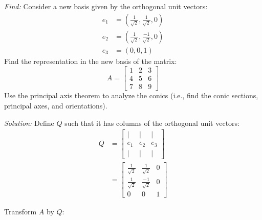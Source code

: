 \documentclass[11pt]{homework}
\begin{document}
\maketitle

\question
\emph{Find:}
\newline
Consider a new basis given by the orthogonal unit vectors:
\begin{align*}
e_1 &= 
  \left( \frac{1}{\sqrt{2}}, \frac{1}{\sqrt{2}}, 0 \right) \\
e_2 &= 
  \left( \frac{1}{\sqrt{2}}, \frac{-1}{\sqrt{2}}, 0 \right) \\
e_3 &= 
  \left( 0,0,1 \right)
\end{align*}
\noindent
Find the representation in the new basis of the matrix:
\begin{equation*}
A = 
  \begin{bmatrix}
    1 & 2 & 3 \\
    4 & 5 & 6 \\
    7 & 8 & 9 
  \end{bmatrix}
\end{equation*}
\noindent
Use the principal axis theorem to analyze the conics
(i.e., find the conic sections, principal axes, and orientations).

\emph{Solution:}
\newline
Define $Q$ such that it has columns of the orthogonal unit vectors:
\begin{align*}
Q &=
    \begin{bmatrix}
    | & | & | \\
    e_1 & e_2 & e_3 \\
    | & | & | 
    \end{bmatrix} \\
  &=
    \begin{bmatrix}
    \frac{1}{\sqrt{2}} & \frac{1}{\sqrt{2}}  & 0 \\
    \frac{1}{\sqrt{2}} & \frac{-1}{\sqrt{2}} & 0 \\
    0                  & 0                   & 1
    \end{bmatrix}
\end{align*}

Transform $A$ by $Q$:
\end{document}
